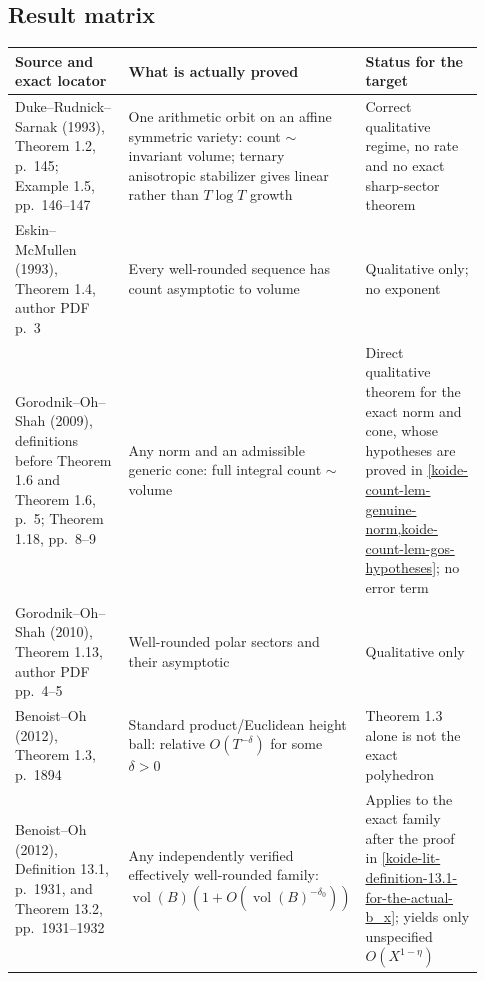 \subsection{Result matrix}\label{koide-lit-result-matrix}

\begin{longtable}[]{@{}
  >{\raggedright\arraybackslash}p{0.31\linewidth}
  >{\raggedright\arraybackslash}p{0.31\linewidth}
  >{\raggedright\arraybackslash}p{0.31\linewidth}@{}}
\toprule\noalign{}
\begin{minipage}[b]{\linewidth}\raggedright
Source and exact locator
\end{minipage} & \begin{minipage}[b]{\linewidth}\raggedright
What is actually proved
\end{minipage} & \begin{minipage}[b]{\linewidth}\raggedright
Status for the target
\end{minipage} \\
\midrule\noalign{}
\endhead
\bottomrule\noalign{}
\endlastfoot
Duke--Rudnick--Sarnak (1993), Theorem 1.2, p.~145; Example 1.5, pp.~146--147 & One arithmetic orbit on an affine symmetric variety: count \(\sim\) invariant volume; ternary anisotropic stabilizer gives linear rather than \(T\log T\) growth & Correct qualitative regime, no rate and no exact sharp-sector theorem \\
Eskin--McMullen (1993), Theorem 1.4, author PDF p.~3 & Every well-rounded sequence has count asymptotic to volume & Qualitative only; no exponent \\
Gorodnik--Oh--Shah (2009), definitions before Theorem 1.6 and Theorem 1.6, p.~5; Theorem 1.18, pp.~8--9 & Any norm and an admissible generic cone: full integral count \(\sim\) volume & Direct qualitative theorem for the exact norm and cone, whose hypotheses are proved in \cref{koide-count-lem-genuine-norm,koide-count-lem-gos-hypotheses}; no error term \\
Gorodnik--Oh--Shah (2010), Theorem 1.13, author PDF pp.~4--5 & Well-rounded polar sectors and their asymptotic & Qualitative only \\
Benoist--Oh (2012), Theorem 1.3, p.~1894 & Standard product/Euclidean height ball: relative \(O(T^{-\delta})\) for some \(\delta>0\) & Theorem 1.3 alone is not the exact polyhedron \\
Benoist--Oh (2012), Definition 13.1, p.~1931, and Theorem 13.2, pp.~1931--1932 & Any independently verified effectively well-rounded family: \(\operatorname{vol}(B)(1+O(\operatorname{vol}(B)^{-\delta_0}))\) & Applies to the exact family after the proof in \cref{koide-lit-definition-13.1-for-the-actual-b_x}; yields only unspecified \(O(X^{1-\eta})\) \\

\end{longtable}
